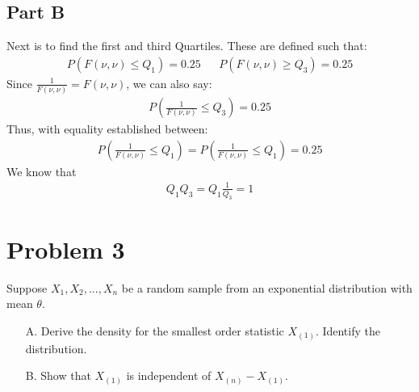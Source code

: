 \documentclass{article}
\begin{document}
\subsection*{Part B}
Next is to find the first and third Quartiles. These are defined such that:
\begin{align*}
P(F(\nu,\nu) \leq Q_1) = 0.25 && P(F(\nu,\nu) \geq Q_3) = 0.25
\end{align*}
Since $\frac{1}{F(\nu,\nu)}=F(\nu,\nu)$, we can also say:
\begin{align*}
P(\frac{1}{F(\nu,\nu)} \leq Q_3) = 0.25
\end{align*}
Thus, with equality established between:
\begin{align*}
P(\frac{1}{F(\nu,\nu)} \leq Q_1) = P(\frac{1}{F(\nu,\nu)} \leq Q_1) = 0.25
\end{align*}
We know that 
\begin{align*}
\boxed{Q_1Q_3 = Q_1\frac{1}{Q_3} = 1}
\end{align*}

\clearpage
\section*{Problem 3}
Suppose $X_1,X_2,...,X_n$ be a random sample from an exponential distribution with mean $\theta$.
\begin{enumerate}
\item[A.] Derive the density for the smallest order statistic $X_{(1)}$. Identify the distribution.
\item[B.] Show that $X_{(1)}$ is independent of $X_{(n)}-X_{(1)}$.
\end{enumerate}
\end{document}
